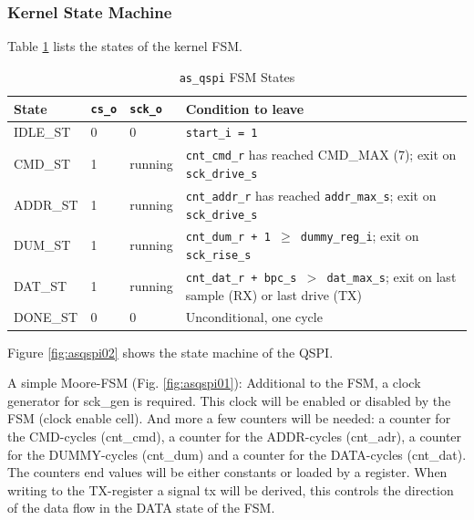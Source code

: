 \subsubsection{Kernel State Machine}

Table \ref{tab:asqspi_fsm} lists the states of the kernel FSM.
\begin{table}[H]
\caption{\texttt{as\_qspi} FSM States}
\label{tab:asqspi_fsm}
\centering
\begin{tabularx}{\textwidth}{|l|l|l|X|}
  \hline
  State & \texttt{cs\_o} & \texttt{sck\_o} & Condition to leave \\
  \hline\hline
  IDLE\_ST  & 0 & 0 & \texttt{start\_i = 1} \\
  \hline
  CMD\_ST   & 1 & running & \texttt{cnt\_cmd\_r} has reached CMD\_MAX (7); exit on \texttt{sck\_drive\_s} \\
  \hline
  ADDR\_ST  & 1 & running & \texttt{cnt\_addr\_r} has reached \texttt{addr\_max\_s}; exit on \texttt{sck\_drive\_s} \\
  \hline
  DUM\_ST   & 1 & running & \texttt{cnt\_dum\_r + 1 $\geq$ dummy\_reg\_i}; exit on \texttt{sck\_rise\_s} \\
  \hline
  DAT\_ST   & 1 & running & \texttt{cnt\_dat\_r + bpc\_s $>$ dat\_max\_s}; exit on last sample (RX) or last drive (TX) \\
  \hline
  DONE\_ST  & 0 & 0 & Unconditional, one cycle \\
  \hline
\end{tabularx}
\end{table}

Figure \ref{fig:asqspi02} shows the state machine of the QSPI.

A simple Moore-FSM (Fig. \ref{fig:asqspi01}): Additional to the FSM, a clock generator for sck\_gen is required. This clock will be enabled or disabled by the FSM (clock enable cell). And more a few counters will be needed: a counter for the CMD-cycles (cnt\_cmd), a counter for the ADDR-cycles (cnt\_adr), a counter for the DUMMY-cycles (cnt\_dum) and a counter for the DATA-cycles (cnt\_dat). The counters end values will be either constants or loaded by a register. When writing to the TX-register a signal tx will be derived, this controls the direction of the data flow in the DATA state of the FSM. 

